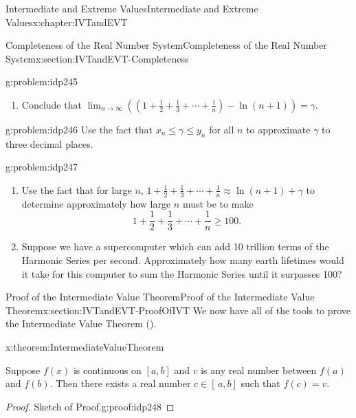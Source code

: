 \begin{chapterptx}{Intermediate and Extreme Values}{}{Intermediate and Extreme Values}{}{}{x:chapter:IVTandEVT}
\begin{sectionptx}{Completeness of the Real Number System}{}{Completeness of the Real Number System}{}{}{x:section:IVTandEVT-Completeness}
\begin{problem}{}{g:problem:idp245}
\begin{enumerate}[font=\bfseries,label=(\alph*),ref=\alph*]
				\item{}Conclude that \(\lim_{n\rightarrow\infty}\left(\left(1+\frac{1}{2}+\frac{1}{3}+\cdots+
				\frac{1}{n}\right)-\ln\left(n+1\right)\right)=\gamma\).%
			\end{enumerate}
		\end{problem}
		\begin{problem}{}{g:problem:idp246}%
			Use the fact that \(x_n\leq\gamma\leq y_n\) for all \(n\) to approximate \(\gamma\) to three decimal places.%
		\end{problem}
		\begin{problem}{}{g:problem:idp247}%
			\begin{enumerate}[font=\bfseries,label=(\alph*),ref=\alph*]
				\item{}Use the fact that for large \(n\), \(1+\frac{1}{2}+\frac{1}{3}+\cdots+\frac{1}{n}\approx
				\ln\left(n+1\right)+ \gamma\) to determine approximately how large \(n\) must be to make%
				\begin{equation*}
					1+\frac{1}{2}+\frac{1}{3}+\cdots+\frac{1}{n}\geq 100\text{.}
				\end{equation*}
				\item{}Suppose we have a supercomputer which can add 10 trillion terms of the Harmonic Series per second. Approximately how many earth lifetimes would it take for this computer to sum the Harmonic Series until it surpasses 100?%
			\end{enumerate}
		\end{problem}
	\end{sectionptx}
	\typeout{************************************************}
	\typeout{************************************************}
	\begin{sectionptx}{Proof of the Intermediate Value Theorem}{}{Proof of the Intermediate Value Theorem}{}{}{x:section:IVTandEVT-ProofOfIVT}
		We now have all of the tools to prove the Intermediate Value Theorem ().%
		\begin{theorem}{}{}{x:theorem:IntermediateValueTheorem}%
			\par
			 Suppose \(f(x)\) is continuous on \([a,b]\) and \(v\) is any real number between \(f(a)\) and \(f(b)\). Then there exists a real number \(c\in[\,a,b]\) such that \(f(c)=v\).%
		\end{theorem}
		\begin{proof}{Sketch of Proof.}{g:proof:idp248}

\end{proof}
\end{sectionptx}
\end{chapterptx}
